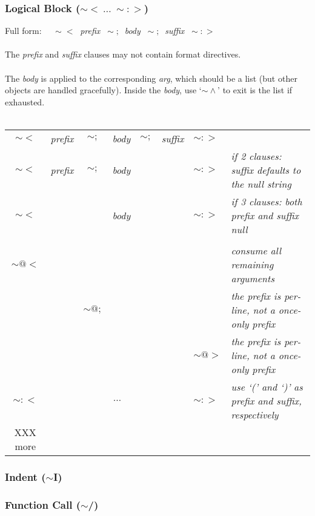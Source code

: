 \documentclass{article}
\begin{document}
\subsubsection{Logical Block ($\sim< \ \ldots \ \sim:>$)}
Full form: $\quad \sim<\ $ {\em prefix} $\ \sim;\ $ {\em body} $\ \sim;\ $ {\em suffix} $\ \sim:>$ \\
\\
The {\em prefix} and {\em suffix} clauses may not contain format directives.\\
\\
The {\em body} is applied to the corresponding {\em arg}, which should
be a list (but other objects are handled gracefully). Inside the {\em
body}, use `{\em $\sim\!\wedge$}' to exit is the list if exhausted. \\
\\
\begin{tabular}{ccccccll}
  $\sim<$ & {\em prefix} & $\sim;$ & {\em body} & $\sim;$ & {\em suffix} & $\sim:>$ \\
  $\sim<$ & {\em prefix} & $\sim;$ & {\em body} &         &              & $\sim:>$ &
   {\em if 2 clauses: suffix defaults to the null string} \\
  $\sim<$ &              &         & {\em body} &         &              & $\sim:>$ &
   {\em if 3 clauses: both prefix and suffix null} \\
\\
  $\sim@<$ &             &         &            &         &              &          &
   {\em consume all remaining arguments} \\
           &             & $\sim@;$ &           &         &              &          &
   {\em the {\em prefix} is per-line, not a once-only prefix} \\
           &             &          &           &         &              & $\sim\!@\!>$ &
   {\em the {\em prefix} is per-line, not a once-only prefix} \\
  $\sim:<$ &                      \multicolumn{5}{c}{$\ldots$}            & $\sim:>$  &
   {\em use `(' and `)' as prefix and suffix, respectively}
\\
XXX more
\end{tabular}

\subsubsection{Indent ($\sim$I)}
\subsubsection{Function Call ($\sim$/)}
\end{document}
